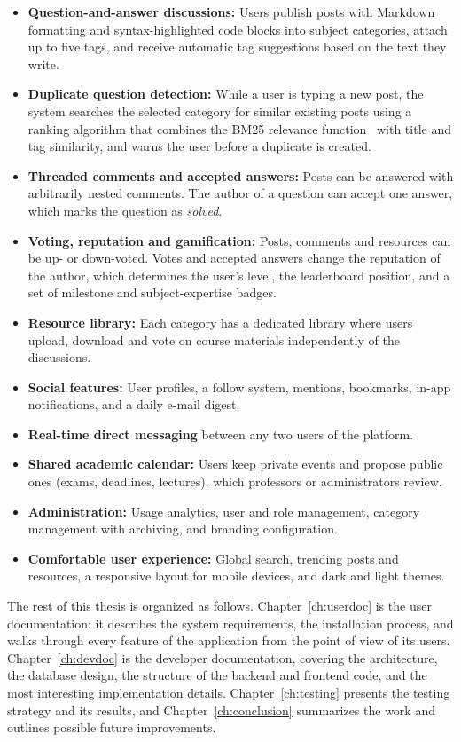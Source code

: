 \begin{itemize}
  \item \textbf{Question-and-answer discussions:} Users publish posts with Markdown
    formatting and syntax-highlighted code blocks into subject categories, attach up to
    five tags, and receive automatic tag suggestions based on the text they write.
  \item \textbf{Duplicate question detection:} While a user is typing a new post, the
    system searches the selected category for similar existing posts using a ranking
    algorithm that combines the BM25 relevance function~\cite{bm25} with title and tag
    similarity, and warns the user before a duplicate is created.
  \item \textbf{Threaded comments and accepted answers:} Posts can be answered with
    arbitrarily nested comments. The author of a question can accept one answer, which
    marks the question as \emph{solved}.
  \item \textbf{Voting, reputation and gamification:} Posts, comments and resources can
    be up- or down-voted. Votes and accepted answers change the reputation of the
    author, which determines the user's level, the leaderboard position, and a set of
    milestone and subject-expertise badges.
  \item \textbf{Resource library:} Each category has a dedicated library where users
    upload, download and vote on course materials independently of the discussions.
  \item \textbf{Social features:} User profiles, a follow system, 
    mentions, bookmarks, in-app notifications, and a daily e-mail digest.
  \item \textbf{Real-time direct messaging} between any two users of the platform.
  \item \textbf{Shared academic calendar:} Users keep private events and propose public
    ones (exams, deadlines, lectures), which professors or administrators review.
  \item \textbf{Administration:} Usage analytics, user and role management, category
    management with archiving, and branding configuration.
  \item \textbf{Comfortable user experience:} Global search, trending posts and
    resources, a responsive layout for mobile devices, and dark and light themes.
\end{itemize}

The rest of this thesis is organized as follows. Chapter~\ref{ch:userdoc} is the user
documentation: it describes the system requirements, the installation process, and
walks through every feature of the application from the point of view of its users.
Chapter~\ref{ch:devdoc} is the developer documentation, covering the architecture,
the database design, the structure of the backend and frontend code, and the most
interesting implementation details. Chapter~\ref{ch:testing} presents the testing
strategy and its results, and Chapter~\ref{ch:conclusion} summarizes the work and
outlines possible future improvements.
